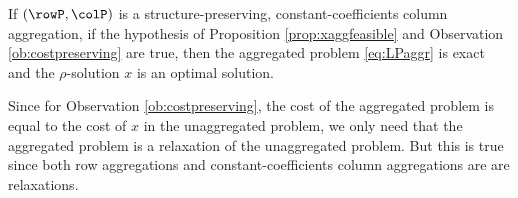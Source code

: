 \documentclass[smallextended,natbib]{svjour3}       %
\DeclareMathOperator{\supp}{supp}
\numberwithin{definition}{section}
\numberwithin{theorem}{section}
\numberwithin{proposition}{section}
\begin{document}
\begin{proposition}
If \((\rowP,\colP)\) is a structure-preserving, constant-coefficients column aggregation,
if the hypothesis of Proposition \ref{prop:xaggfeasible} and Observation \ref{ob:costpreserving} are true, then the aggregated problem \eqref{eq:LPaggr} is exact and the \(\rho\)-solution \(x\) is an optimal solution.
\end{proposition}

   Since for Observation \ref{ob:costpreserving}, the cost of the aggregated problem is equal to the cost of \(x\) in the unaggregated problem, we only need that the aggregated problem is a relaxation of the unaggregated problem.
   But this is true since both row aggregations and constant-coefficients column aggregations are are relaxations.
\end{document}
